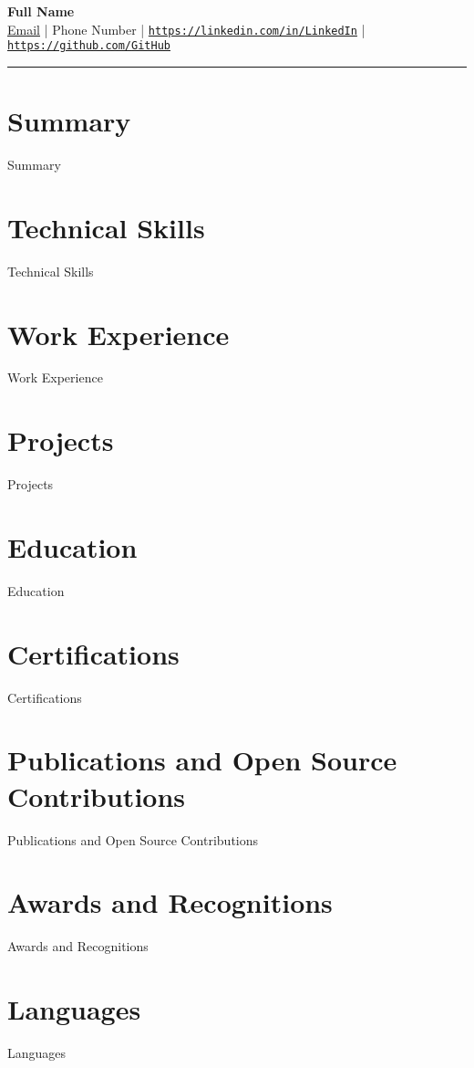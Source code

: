 \documentclass[a4paper,10pt]{article}
\begin{document}
\begin{center}
    {\Huge \textbf{{{Full Name}}}}\\
    \href{mailto:{{Email}}}{{Email}} | {{Phone Number}} | 
    \href{https://linkedin.com/in/{{LinkedIn}}}{\texttt{https://linkedin.com/in/{{LinkedIn}}}} | 
    \href{https://github.com/{{GitHub}}}{\texttt{https://github.com/{{GitHub}}}}
\end{center}

\hrule

\section*{Summary}
{{Summary}}

\section*{Technical Skills}
\begin{itemize}
    {{Technical Skills}}
\end{itemize}

\section*{Work Experience}
{{Work Experience}}

\section*{Projects}
{{Projects}}

\section*{Education}
{{Education}}

\section*{Certifications}
{{Certifications}}

\section*{Publications and Open Source Contributions}
{{Publications and Open Source Contributions}}

\section*{Awards and Recognitions}
{{Awards and Recognitions}}

\section*{Languages}
\begin{itemize}
    {{Languages}}
\end{itemize}
\end{document}
